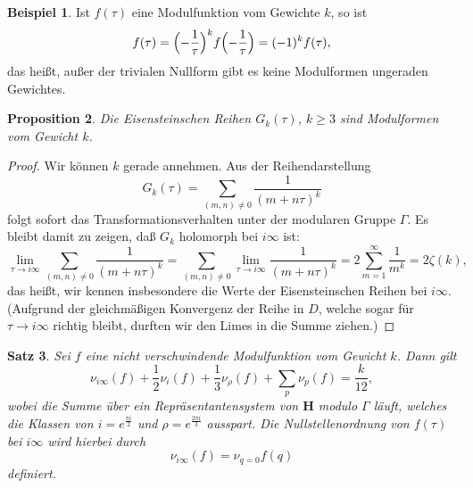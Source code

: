 \documentclass[a4paper,twoside,openright]{report}
\newtheorem{thm}{Satz}[chapter]
\newtheorem{prop}[thm]{Proposition}
\theoremstyle{definition}
\newtheorem{xca}[thm]{Beispiel}
\theoremstyle{remark}
\begin{document}
\begin{xca}
  Ist $f(\tau)$ eine Modulfunktion vom Gewichte $k$, so ist
  \[
    f(\tau) = \Bigl(- \frac 1 \tau\Bigr)^k f\Bigl(- \frac 1 \tau\Bigr)
    = (-1)^k f(\tau),
  \]
  das heißt, außer der trivialen Nullform gibt es keine Modulformen ungeraden Gewichtes.
\end{xca}

\begin{prop}
  Die Eisensteinschen Reihen $G_k(\tau)$, $k \ge 3$ sind Modulformen vom Gewicht $k$.
\end{prop}

\begin{proof}
  Wir können $k$ gerade annehmen. Aus der Reihendarstellung
  \[
    G_k(\tau) = \sum_{(m, n) \neq 0} \frac 1{(m + n\tau)^k}
  \]
  folgt sofort das Transformationsverhalten unter der modularen Gruppe $\Gamma$.
  Es bleibt damit zu zeigen, daß $G_k$ holomorph bei $i \infty$ ist:
  \[
    \lim_{\tau \to i \infty} \sum_{(m, n) \neq 0} \frac1{(m + n\tau)^k}
    = \sum_{(m, n) \neq 0} \lim_{\tau \to i\infty} \frac1{(m + n\tau)^k}
    =  2 \sum_{m = 1}^\infty \frac 1{m^k} = 2 \zeta(k),
  \]
  das heißt, wir kennen insbesondere die Werte der Eisensteinschen Reihen bei
  $i\infty$. (Aufgrund der gleichmäßigen Konvergenz der Reihe in $D$, welche sogar für
  $\tau \to i\infty$ richtig bleibt, durften wir den Limes in die Summe ziehen.)
\end{proof}

\begin{thm}
  Sei $f$ eine nicht verschwindende Modulfunktion vom Gewicht $k$. Dann
  gilt
  \[
    \nu_{i \infty}(f) + \frac 1 2 \nu_i(f) + \frac 1 3 \nu_\rho(f) + \sum_p \nu_p(f) = \frac k{12},
  \]
  wobei die Summe über ein Repräsentantensystem von $\mathbf H$ modulo $\Gamma$
  läuft, welches die Klassen von $i = e^{\frac {\pi i} 2}$ und $\rho = e^{\frac{2 \pi i} 3}$
  ausspart. Die Nullstellenordnung von $f(\tau)$ bei $i \infty$ wird hierbei 
  durch
  \[
    \nu_{i \infty} (f) = \nu_{q = 0} f(q)
  \]
  definiert.
\end{thm}
\end{document}
